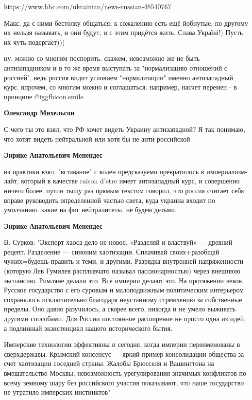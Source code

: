 \begin{itemize}
\begin{itemize}
\url{https://www.bbc.com/ukrainian/news-russian-48540767}


Макс, да с ними бестолку общаться, к сожалению есть ещё йобнутые, по другому их
нельзя называть, и они будут, и с этим придётся жить. Слава Україні!) Пусть их
чуть подергает)))

\end{itemize} %


ну, можно со многим поспорить. скажем, невозможно же не быть антизападником и в
то же время выступать за "нормализацию отношений с россией", ведь россия видит
условием "нормализации" именно антизападный курс. впрочем, со многим можно и
соглашаться. например, насчет перемен - в принципе  @igg{fbicon.smile} 

\begin{itemize} %
\textbf{Олександр Михельсон} 

С чего ты это взял, что РФ хочет видеть Украину антизападной? Я так понимаю,
что хотят видеть нейтральной или хотя бы не анти-российской

\textbf{Энрике Анатольевич Менендес} 

из практики взял. "вставание" с колен предсказуемо превратилось в
империализм-лайт, который в качестве raison d'etre имеет антизападный курс, и
совершенно ничего более. путин тыщу раз прямым текстом говорил, что россия
считает себя вправе руководить определенной частью света, куда украина входит
по умолчанию. какие на фиг нейтралитеты, не будем детьми.

\textbf{Энрике Анатольевич Менендес}

В. Сурков: "Экспорт хаоса дело не новое. «Разделяй и властвуй» — древний
рецепт. Разделение — синоним хаотизации. Сплачивай своих+разобщай чужих=будешь
править и теми, и другими. Разрядка внутренней напряженности (которую Лев
Гумилев расплывчато называл пассионарностью) через внешнюю экспансию. Римляне
делали это. Все империи делают это. На протяжении веков Русское государство с
его суровым и малоподвижным политическим интерьером сохранялось исключительно
благодаря неустанному стремлению за собственные пределы. Оно давно разучилось,
а скорее всего, никогда и не умело выживать другими способами. Для России
постоянное расширение не просто одна из идей, а подлинный экзистенциал нашего
исторического бытия.

Имперские технологии эффективны и сегодня, когда империи переименованы в
сверхдержавы. Крымский консенсус — яркий пример консолидации общества за счет
хаотизации соседней страны. Жалобы Брюсселя и Вашингтона на вмешательство
Москвы, невозможность урегулирования значимых конфликтов по всему земному шару
без российского участия показывают, что наше государство не утратило имперских
инстинктов"


\end{itemize}
\end{itemize}
